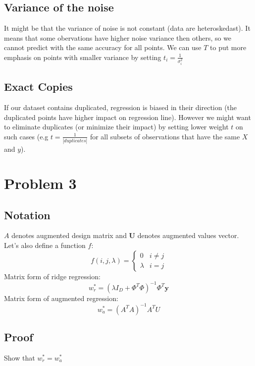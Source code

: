 \documentclass{article}
\begin{document}
\subsection{Variance of the noise}
It might be that the variance of noise is not constant (data are heteroskedast). It means that some obervations have higher noise
variance then others, so we cannot predict with the same accuracy for all points. We can use $T$ to put more emphasis on points with
smaller variance by setting $t_i = \frac{1}{\sigma_i^2}$
\subsection{Exact Copies}
If our dataset contains duplicated, regression is biased in their direction (the duplicated points have higher impact on regression line).
However we might want to eliminate duplicates (or minimize their impact) by setting lower weight $t$ on such cases 
(e.g $t=\frac{1}{|duplicates|}$ for all subsets of observations that have the same $X$ and $y$). 
\section{Problem 3}
\subsection{Notation}
$A$ denotes augmented design matrix and $\mathbf{U}$ denotes augmented values vector.\\
Let's also define a function $f$:
\[ f(i,j,\lambda) =  \begin{cases} 
    0 & i \neq j \\
    \lambda & i = j 
 \end{cases}
\]
Matrix form of ridge regression:
\begin{equation}
    w_r^*=(\lambda I_D + \Phi^T\Phi)^{-1}\Phi^T\mathbf{y}    
\end{equation}
Matrix form of augmented regression:
\begin{equation}
    w_a ^*=(A^TA)^{-1}A^TU    
\end{equation}
\subsection{Proof}
Show that $w_r^*=w_a^*$
\end{document}
